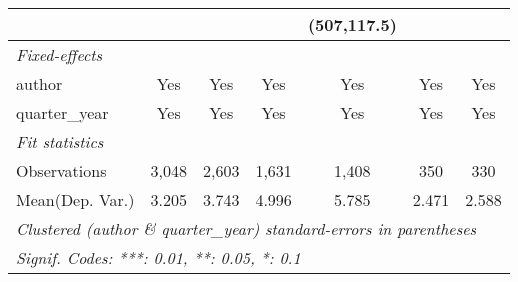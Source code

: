 \begin{tabular}{lcccccc}
                                         &               &               &               & (507,117.5)  &               &   \\   
   \midrule
   \emph{Fixed-effects}\\
   author                                & Yes           & Yes           & Yes           & Yes          & Yes           & Yes\\  
   quarter\_year                         & Yes           & Yes           & Yes           & Yes          & Yes           & Yes\\  
   \midrule
   \emph{Fit statistics}\\
   Observations                          & 3,048         & 2,603         & 1,631         & 1,408        & 350           & 330\\  
Mean(Dep. Var.) & 3.205 & 3.743 & 4.996 & 5.785 & 2.471 & 2.588 \\
   \midrule \midrule
   \multicolumn{7}{l}{\emph{Clustered (author \& quarter\_year) standard-errors in parentheses}}\\
   \multicolumn{7}{l}{\emph{Signif. Codes: ***: 0.01, **: 0.05, *: 0.1}}\\
\end{tabular}
\par\endgroup
